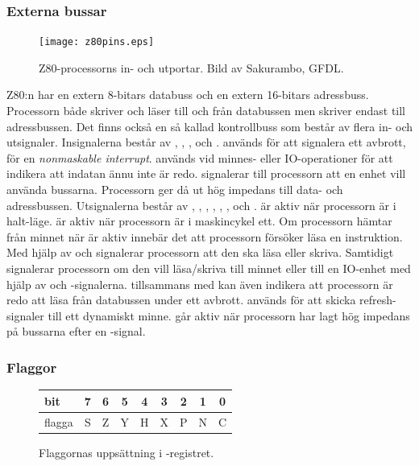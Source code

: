 \documentclass[main.tex]{subfiles}
\begin{document}
\subsubsection{Externa bussar}
\begin{figure}
    \centering
    \vspace{-5mm}
    \texttt{[image: z80pins.eps]}
    \caption{Z80-processorns in- och utportar. Bild av Sakurambo, GFDL.}
    \label{fig:z80pins}
\end{figure}
Z80:n har en extern 8-bitars databuss och en extern 16-bitars adressbuss.
Processorn både skriver och läser till och från databussen men skriver endast
till adressbussen. Det finns också en så kallad kontrollbuss som består av
flera in- och utsignaler. Insignalerna består av , ,
,  och .  används för att
signalera ett avbrott,  för en {\it nonmaskable interrupt}.
 används vid minnes- eller IO-operationer för att indikera att
indatan ännu inte är redo.  signalerar till processorn att en
enhet vill använda bussarna. Processorn ger då ut hög impedans till data- och
adressbussen. Utsignalerna består av , , ,
, , ,  och .  är
aktiv när processorn är i halt-läge.  är aktiv när processorn är i
maskincykel ett. Om processorn hämtar från minnet när  är aktiv
innebär det att processorn försöker läsa en instruktion. Med hjälp av 
och  signalerar processorn att den ska läsa eller skriva. Samtidigt
signalerar processorn om den vill läsa/skriva till minnet eller till en
IO-enhet med hjälp av  och -signalerna. 
tillsammans med  kan även indikera att processorn är redo att läsa
från databussen under ett avbrott.  används för att skicka
refresh-signaler till ett dynamiskt minne.  går aktiv när
processorn har lagt hög impedans på bussarna efter en -signal.

\subsubsection{Flaggor}
\label{sec:theory:flags}
\begin{figure}[b]
    \center
    \begin{tabular}{|l|c|c|c|c|c|c|c|c|}
        \hline
        bit     & 7 & 6 & 5 & 4 & 3 & 2 & 1 & 0 \\ \hline
        flagga  & S & Z & Y & H & X & P & N & C \\ \hline
    \end{tabular}
    \caption{Flaggornas uppsättning i -registret.}
    \label{fig:flags}
\end{figure}
\end{document}
